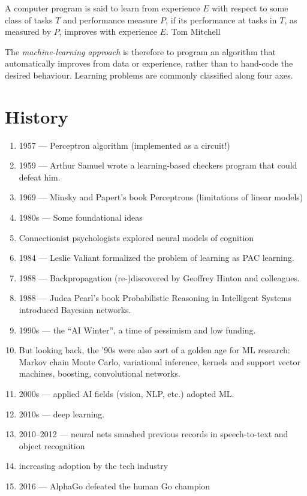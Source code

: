 \documentclass[a4paper, 12pt]{book}
\begin{document}
\begin{epigraph}
{
A computer program is said to learn from experience $E$ with respect to some class of
tasks $T$ and performance measure $P$, if its performance at tasks in $T$, as
measured by $P$, improves with experience $E$.
}{Tom Mitchell}
\end{epigraph}

The \emph{machine-learning approach} is therefore to program an algorithm that automatically improves from data or experience, rather than to hand-code the desired behaviour. Learning problems are commonly classified along four axes.


\section{History}

\begin{enumerate}
    \item 1957 — Perceptron algorithm (implemented as a circuit!)
    \item 1959 — Arthur Samuel wrote a learning-based checkers program that could defeat him.
    \item 1969 — Minsky and Papert’s book Perceptrons (limitations of linear models)
    \item 1980s — Some foundational ideas
    \item Connectionist psychologists explored neural models of cognition
    \item 1984 — Leslie Valiant formalized the problem of learning as PAC learning.
    \item 1988 — Backpropagation (re-)discovered by Geoffrey Hinton and colleagues.
    \item 1988 — Judea Pearl’s book Probabilistic Reasoning in Intelligent Systems introduced Bayesian networks.
    \item 1990s — the “AI Winter”, a time of pessimism and low funding.
    \item But looking back, the ’90s were also sort of a golden age for ML research: Markov chain Monte Carlo, variational inference, kernels and support vector machines, boosting, convolutional networks.
    \item 2000s — applied AI fields (vision, NLP, etc.) adopted ML.
    \item 2010s — deep learning.
    \item 2010–2012 — neural nets smashed previous records in speech-to-text and object recognition
    \item increasing adoption by the tech industry
    \item 2016 — AlphaGo defeated the human Go champion
\end{enumerate}
\end{document}
